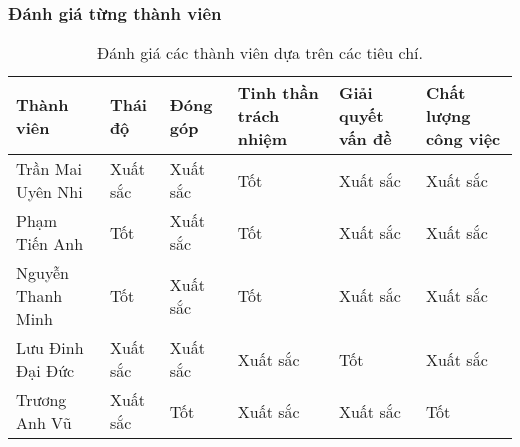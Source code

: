 \documentclass[a4paper, 12pt]{article}
\begin{document}
\subsubsection{Đánh giá từng thành viên}
\begin{table}[h!]
\centering
\renewcommand{\arraystretch}{1.5} %
\setlength{\tabcolsep}{10pt} %
\begin{tabular}{|p{4cm}|p{1.5cm}|p{1.5cm}|p{1.5cm}|p{1.5cm}|p{1.5cm}|}
    \hline
    \textbf{Thành viên} & \textbf{Thái độ} & \textbf{Đóng góp} & \textbf{Tinh thần trách nhiệm} & \textbf{Giải quyết vấn đề} & \textbf{Chất lượng công việc} \\
    \hline
    Trần Mai Uyên Nhi & Xuất sắc & Xuất sắc & Tốt & Xuất sắc & Xuất sắc \\
    \hline
    Phạm Tiến Anh & Tốt & Xuất sắc & Tốt & Xuất sắc & Xuất sắc \\
    \hline
    Nguyễn Thanh Minh & Tốt & Xuất sắc & Tốt & Xuất sắc & Xuất sắc \\
    \hline
    Lưu Đinh Đại Đức & Xuất sắc & Xuất sắc & Xuất sắc & Tốt & Xuất sắc \\
    \hline
    Trương Anh Vũ & Xuất sắc & Tốt & Xuất sắc & Xuất sắc & Tốt \\
    \hline
\end{tabular}
\caption{Đánh giá các thành viên dựa trên các tiêu chí.}
\label{tab:member-evaluation}
\end{table}
\end{document}
